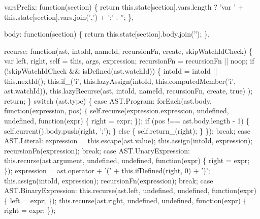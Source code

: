 \begin{DoxyCodeInclude}
{{{  varsPrefix: \textcolor{keyword}{function}(section) \{
    \textcolor{keywordflow}{return} this.state[section].vars.length ? \textcolor{stringliteral}{'var '} + this.state[section].vars.join(\textcolor{charliteral}{','}) + \textcolor{charliteral}{';'} : \textcolor{stringliteral}{''};
  \},

  body: \textcolor{keyword}{function}(section) \{
    \textcolor{keywordflow}{return} this.state[section].body.join(\textcolor{stringliteral}{''});
  \},

  recurse: \textcolor{keyword}{function}(ast, intoId, nameId, recursionFn, create, skipWatchIdCheck) \{
    var left, right, \textcolor{keyword}{self} = \textcolor{keyword}{this}, args, expression;
    recursionFn = recursionFn || noop;
    \textcolor{keywordflow}{if} (!skipWatchIdCheck && isDefined(ast.watchId)) \{
      intoId = intoId || this.nextId();
      this.if\_(\textcolor{charliteral}{'i'},
        this.lazyAssign(intoId, this.computedMember(\textcolor{charliteral}{'i'}, ast.watchId)),
        \textcolor{keyword}{this}.lazyRecurse(ast, intoId, nameId, recursionFn, create, \textcolor{keyword}{true})
      );
      \textcolor{keywordflow}{return};
    \}
    \textcolor{keywordflow}{switch} (ast.type) \{
    \textcolor{keywordflow}{case} AST.Program:
      forEach(ast.body, \textcolor{keyword}{function}(expression, pos) \{
        self.recurse(expression.expression, undefined, undefined, function(expr) \{ right = expr; \});
        \textcolor{keywordflow}{if} (pos !== ast.body.length - 1) \{
          \textcolor{keyword}{self}.current().body.push(right, \textcolor{charliteral}{';'});
        \} \textcolor{keywordflow}{else} \{
          \textcolor{keyword}{self}.return\_(right);
        \}
      \});
      \textcolor{keywordflow}{break};
    \textcolor{keywordflow}{case} AST.Literal:
      expression = this.escape(ast.value);
      this.assign(intoId, expression);
      recursionFn(expression);
      \textcolor{keywordflow}{break};
    \textcolor{keywordflow}{case} AST.UnaryExpression:
      this.recurse(ast.argument, undefined, undefined, \textcolor{keyword}{function}(expr) \{ right = expr; \});
      expression = ast.operator + \textcolor{charliteral}{'('} + this.ifDefined(right, 0) + \textcolor{charliteral}{')'};
      this.assign(intoId, expression);
      recursionFn(expression);
      \textcolor{keywordflow}{break};
    \textcolor{keywordflow}{case} AST.BinaryExpression:
      this.recurse(ast.left, undefined, undefined, \textcolor{keyword}{function}(expr) \{ left = expr; \});
      this.recurse(ast.right, undefined, undefined, \textcolor{keyword}{function}(expr) \{ right = expr; \});
}}}
\end{DoxyCodeInclude}
